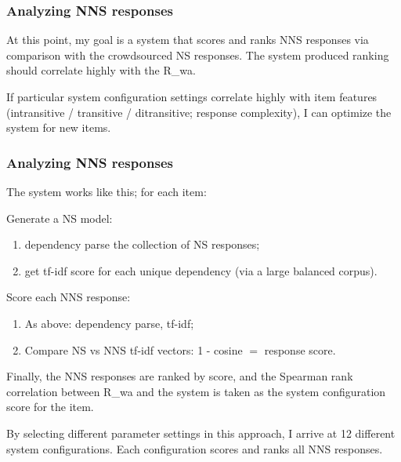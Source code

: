 \documentclass[xcolor={dvipsnames}]{beamer}
\begin{document}
\begin{frame}
\frametitle{Analyzing NNS responses}
\small
At this point, my goal is a system that scores and ranks NNS responses via comparison with the crowdsourced NS responses. The system produced ranking should correlate highly with the R_{wa}.

\bigskip

If particular system configuration settings correlate highly with item features (intransitive / transitive / ditransitive; response complexity), I can optimize the system for new items.
\end{frame}

\begin{frame}
\frametitle{Analyzing NNS responses}
\small
The system works like this; for each item:

\medskip
Generate a NS model:
\begin{enumerate}
\item dependency parse the collection of NS responses;
\item get tf-idf score for each unique dependency (via a large balanced corpus).
\end{enumerate}

\medskip

Score each NNS response:
\begin{enumerate}
\item As above: dependency parse, tf-idf;
\item Compare NS vs NNS tf-idf vectors: 1 - cosine $=$ response score.
\end{enumerate}

Finally, the NNS responses are ranked by score, and the Spearman rank correlation between R_{wa} and the system is taken as the system configuration score for the item.

\bigskip

By selecting different parameter settings in this approach, I arrive at 12 different system configurations. Each configuration scores and ranks all NNS responses.

\end{frame}
\end{document}
